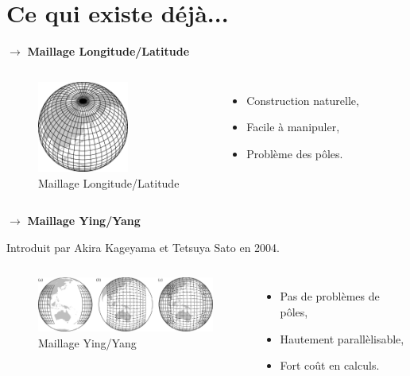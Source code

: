 \documentclass[11pt]{beamer}
\begin{document}

\section{Ce qui existe déjà...}
\begin{frame}
$\rightarrow$ \textbf{Maillage Longitude/Latitude}
\begin{columns}
\begin{figure}
\includegraphics[height=3cm]{lonlat_grid.jpg}
\caption{Maillage Longitude/Latitude}
\end{figure}
\pause
{}
\begin{itemize}
\item Construction naturelle,
\item Facile à manipuler,
\item Problème des pôles.
\end{itemize}
\end{columns}
\end{frame}

\begin{frame}
$\rightarrow$ \textbf{Maillage Ying/Yang}

Introduit par Akira Kageyama et Tetsuya Sato en 2004.

\begin{columns}
\begin{figure}
\includegraphics[width=6cm]{yingyang_grid.jpg}
\caption{Maillage Ying/Yang}
\end{figure}
\pause
{}
\begin{itemize}
\item Pas de problèmes de pôles,
\item Hautement parallèlisable,
\item Fort coût en calculs.
\end{itemize}
\end{columns}
\end{frame}
\end{document}

